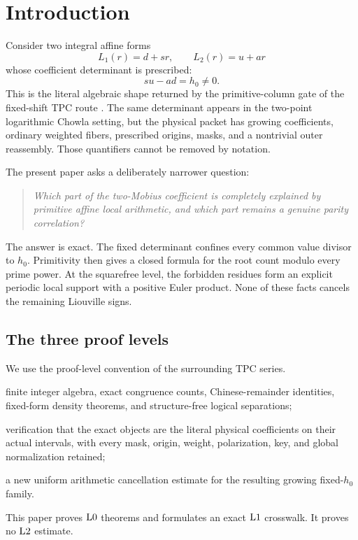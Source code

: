 \section{Introduction}
\label{sec:introduction}

Consider two integral affine forms
\begin{equation}
 L_1(r)=d+sr,\qquad
 L_2(r)=u+ar
\label{eq:affine-pair}
\end{equation}
whose coefficient determinant is prescribed:
\begin{equation}
 su-ad=h_0\ne0.
\label{eq:fixed-determinant}
\end{equation}
This is the literal algebraic shape returned by the primitive-column
gate of the fixed-shift TPC route \citep{WangTPC33}.  The same
determinant appears in the two-point logarithmic Chowla setting, but
the physical packet has growing coefficients, ordinary weighted
fibers, prescribed origins, masks, and a nontrivial outer
reassembly.  Those quantifiers cannot be removed by notation.

The present paper asks a deliberately narrower question:
\begin{quote}
\emph{Which part of the two-Mobius coefficient is completely
explained by primitive affine local arithmetic, and which part
remains a genuine parity correlation?}
\end{quote}
The answer is exact.  The fixed determinant confines every common
value divisor to \(h_0\).  Primitivity then gives a closed formula for
the root count modulo every prime power.  At the squarefree level,
the forbidden residues form an explicit periodic local support with
a positive Euler product.  None of these facts cancels the remaining
Liouville signs.

\subsection{The three proof levels}

We use the proof-level convention of the surrounding TPC series.
\begin{description}[leftmargin=3.2em,style=nextline]
\item[\(\Lzero\):]
finite integer algebra, exact congruence counts, Chinese-remainder
identities, fixed-form density theorems, and structure-free logical
separations;
\item[\(\Lone\):]
verification that the exact objects are the literal physical
coefficients on their actual intervals, with every mask, origin,
weight, polarization, key, and global normalization retained;
\item[\(\Ltwo\):]
a new uniform arithmetic cancellation estimate for the resulting
growing fixed-\(h_0\) family.
\end{description}
This paper proves \(\Lzero\) theorems and formulates an exact
\(\Lone\) crosswalk.  It proves no \(\Ltwo\) estimate.

